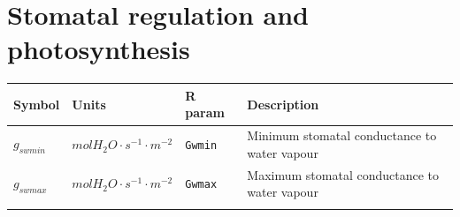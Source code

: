 \documentclass[]{book}
\begin{document}
\hypertarget{stomatal-regulation-and-photosynthesis-1}{%
\section{Stomatal regulation and photosynthesis}\label{stomatal-regulation-and-photosynthesis-1}}

\begin{longtable}[]{@{}llll@{}}
\toprule
\begin{minipage}[b]{0.11\columnwidth}\raggedright
Symbol\strut
\end{minipage} & \begin{minipage}[b]{0.10\columnwidth}\raggedright
Units\strut
\end{minipage} & \begin{minipage}[b]{0.12\columnwidth}\raggedright
R param\strut
\end{minipage} & \begin{minipage}[b]{0.45\columnwidth}\raggedright
Description\strut
\end{minipage}\tabularnewline
\midrule
\endhead
\begin{minipage}[t]{0.11\columnwidth}\raggedright
\(g_{swmin}\)\strut
\end{minipage} & \begin{minipage}[t]{0.10\columnwidth}\raggedright
\(mol H_2O \cdot s^{-1} \cdot m^{-2}\)\strut
\end{minipage} & \begin{minipage}[t]{0.12\columnwidth}\raggedright
\texttt{Gwmin}\strut
\end{minipage} & \begin{minipage}[t]{0.45\columnwidth}\raggedright
Minimum stomatal conductance to water vapour\strut
\end{minipage}\tabularnewline
\begin{minipage}[t]{0.11\columnwidth}\raggedright
\(g_{swmax}\)\strut
\end{minipage} & \begin{minipage}[t]{0.10\columnwidth}\raggedright
\(mol H_2O \cdot s^{-1} \cdot m^{-2}\)\strut
\end{minipage} & \begin{minipage}[t]{0.12\columnwidth}\raggedright
\texttt{Gwmax}\strut
\end{minipage} & \begin{minipage}[t]{0.45\columnwidth}\raggedright
Maximum stomatal conductance to water vapour\strut
\end{minipage}\tabularnewline
\begin{minipage}[t]{0.11\columnwidth}\raggedright

\end{minipage}
\end{longtable}
\end{document}

